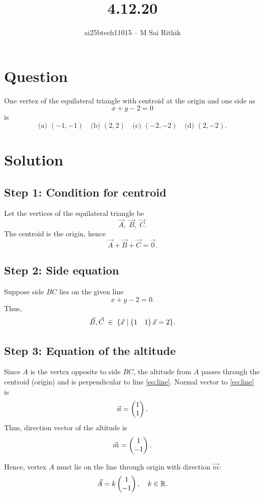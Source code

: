 \documentclass[12pt]{article}
\title{4.12.20}
\author{ai25btech11015 -- M Sai Rithik}
\date{}
\begin{document}
\maketitle

\section*{Question}
One vertex of the equilateral triangle with centroid at the origin and one side as 
\[
x + y - 2 = 0
\]
is
\[
\text{(a) }(-1,-1) \quad 
\text{(b) }(2,2) \quad 
\text{(c) }(-2,-2) \quad 
\text{(d) }(2,-2).
\]

\section*{Solution}

\subsection*{Step 1: Condition for centroid}
Let the vertices of the equilateral triangle be
\[
\Vec{A}, \; \Vec{B}, \; \Vec{C}.
\]
The centroid is the origin, hence
\begin{equation}
\Vec{A} + \Vec{B} + \Vec{C} = \Vec{0}.
\label{eq:centroid}
\end{equation}

\subsection*{Step 2: Side equation}
Suppose side \(BC\) lies on the given line
\begin{equation}
x + y - 2 = 0.
\label{eq:line}
\end{equation}
Thus, 
\[
\Vec{B}, \Vec{C} \;\in\; \{ \Vec{x} \mid \begin{pmatrix}1 & 1\end{pmatrix}\Vec{x} = 2 \}.
\]

\subsection*{Step 3: Equation of the altitude}
Since \(A\) is the vertex opposite to side \(BC\), the altitude from \(A\) passes through the centroid (origin) and is perpendicular to line \eqref{eq:line}.  
Normal vector to \eqref{eq:line} is
\[
\Vec{n} = \begin{pmatrix}1 \\ 1\end{pmatrix}.
\]
Thus, direction vector of the altitude is
\[
\Vec{m} = \begin{pmatrix}1 \\ -1\end{pmatrix}.
\]

Hence, vertex \(A\) must lie on the line through origin with direction \(\Vec{m}\):
\begin{equation}
\Vec{A} = k \begin{pmatrix}1 \\ -1\end{pmatrix}, \quad k \in \mathbb{R}.
\label{eq:Aform}
\end{equation}
\end{document}
